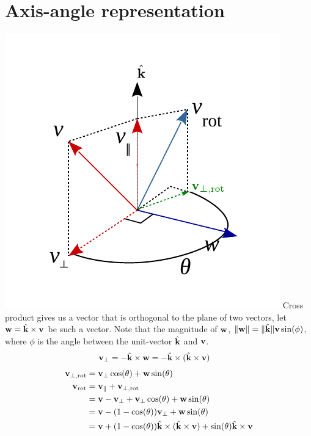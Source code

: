 \documentclass{article}
\begin{document}
\section{Axis-angle representation}
\includegraphics[width=\linewidth]{media/Rodrigues-formula.pdf}
%
Cross product gives us a vector that is orthogonal to the plane of two vectors,
let $\mathbf{w} = \hat{\mathbf{k}} \times \mathbf{v}$ be such a vector. Note that the magnitude of
$\mathbf{w}$, $\|\mathbf{w}\| = \|\hat{\mathbf{k}}\| \mathbf{v} \sin(\phi)$, where $\phi$ is the angle
between the unit-vector $\hat{\mathbf{k}}$ and $\mathbf{v}$.
\begin{align}
  \mathbf{v}_\perp &= - \hat{\mathbf{k}} \times \mathbf{w} = -  \hat{\mathbf{k}} \times (\hat{\mathbf{k}} \times \mathbf{v})
\end{align}
\begin{align}
  \mathbf{v}_{\perp,\text{rot}}  &= \mathbf{v}_\perp\cos(\theta) + \mathbf{w}\sin(\theta)
  \\
  \mathbf{v}_{\text{rot}} &=  \mathbf{v}_\parallel +   \mathbf{v}_{\perp,\text{rot}}
  \notag\\
       &=  \mathbf{v} - \mathbf{v}_\perp +   \mathbf{v}_\perp\cos(\theta) + \mathbf{w}\sin(\theta)
  \notag\\
       &=  \mathbf{v} - (1-\cos(\theta)) \mathbf{v}_\perp + \mathbf{w} \sin(\theta)
  \notag\\
       &=  \mathbf{v} + (1-\cos(\theta)) \hat{\mathbf{k}} \times (\hat{\mathbf{k}} \times \mathbf{v}) +  \sin(\theta) \hat{\mathbf{k}} \times \mathbf{v}
\end{align}
\end{document}

